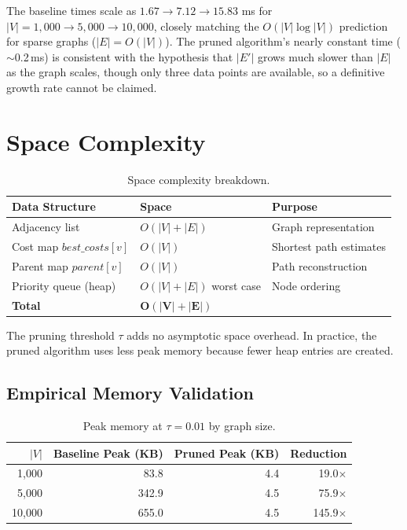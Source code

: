 \noindent The baseline times scale as $1.67 \to 7.12 \to 15.83$ ms for $|V|=1{,}000 \to 5{,}000 \to 10{,}000$, closely matching the $O(|V|\log|V|)$ prediction for sparse graphs ($|E|=O(|V|)$). The pruned algorithm's nearly constant time ($\sim$0.2\,ms) is consistent with the hypothesis that $|E'|$ grows much slower than $|E|$ as the graph scales, though only three data points are available, so a definitive growth rate cannot be claimed.

\section{Space Complexity}

\begin{table}[htbp]
\centering
\renewcommand{\arraystretch}{1.3}
\begin{tabular}{@{}lll@{}}
\toprule
\textbf{Data Structure} & \textbf{Space} & \textbf{Purpose} \\
\midrule
Adjacency list & $O(|V|+|E|)$ & Graph representation \\
Cost map $\mathit{best\_costs}[v]$ & $O(|V|)$ & Shortest path estimates \\
Parent map $\mathit{parent}[v]$ & $O(|V|)$ & Path reconstruction \\
Priority queue (heap) & $O(|V|+|E|)$ worst case & Node ordering \\
\midrule
\textbf{Total} & $\mathbf{O(|V|+|E|)}$ & \\
\bottomrule
\end{tabular}
\caption[Space complexity breakdown]{Space complexity breakdown.}
\label{table:space_complexity}
\end{table}

The pruning threshold $\tau$ adds no asymptotic space overhead. In practice, the pruned algorithm uses less peak memory because fewer heap entries are created.

\subsection{Empirical Memory Validation}

\begin{table}[htbp]
\centering
\renewcommand{\arraystretch}{1.3}
\begin{tabular}{@{}rrrr@{}}
\toprule
$|V|$ & \textbf{Baseline Peak (KB)} & \textbf{Pruned Peak (KB)} & \textbf{Reduction} \\
\midrule
1,000  & 83.8 & 4.4 & 19.0$\times$ \\
5,000  & 342.9 & 4.5 & 75.9$\times$ \\
10,000 & 655.0 & 4.5 & 145.9$\times$ \\
\bottomrule
\end{tabular}
\caption[Peak memory scaling by graph size]{Peak memory at $\tau=0.01$ by graph size.}
\label{table:memory_by_size}
\end{table}

